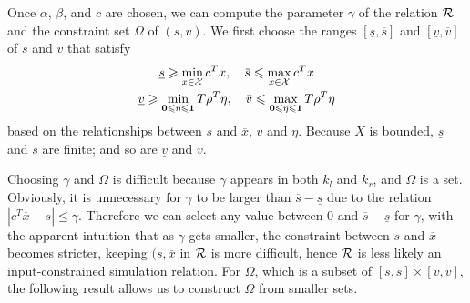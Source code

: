 Once $\alpha$, $\beta$, and $c$ are chosen, we can compute the parameter $\gamma$ of the relation $\mathcal{R}$ and the constraint set $\Omega$ of $(s,v)$.
We first choose the ranges $[\underline{s}, \overbar{s}]$ and $[\underline{v}, \overbar{v}]$ of $s$ and $v$ that satisfy
\begin{gather*}
  \underline{s} \geqslant \min_{x \in \XSet} c^{T} x, \quad
  \overbar{s} \leqslant \max_{x \in \XSet} c^{T} x \\
  \underline{v} \geqslant \min_{\Zero \leqslant \eta \leqslant \One} T \rho^{T} \eta, \quad
  \overbar{v} \leqslant \max_{\Zero \leqslant \eta \leqslant \One} T \rho^{T} \eta
\end{gather*}
based on the relationships between $s$ and $\overbar{x}$, $v$ and $\eta$.
Because $X$ is bounded, $\underline{s}$ and $\overbar{s}$ are finite; and so are $\underline{v}$ and $\overbar{v}$.

Choosing $\gamma$ and $\Omega$ is difficult because $\gamma$ appears in both $k_{l}$ and $k_{r}$, and $\Omega$ is a set.
Obviously, it is unnecessary for $\gamma$ to be larger than $\overbar{s} - \underline{s}$ due to the relation $| c^{T} \overbar{x} - s | \leqslant \gamma$.
Therefore we can select any value between $0$ and $\overbar{s} - \underline{s}$ for $\gamma$, with the apparent intuition that as $\gamma$ gets smaller, the constraint between $s$ and $\overbar{x}$ becomes stricter, keeping $(s, \overbar{x}$ in $\mathcal{R}$ is more difficult, hence $\mathcal{R}$ is less likely an input-constrained simulation relation.
For $\Omega$, which is a subset of $[\underline{s}, \overbar{s}] \times[\underline{v}, \overbar{v}]$, the following result allows us to construct $\Omega$ from smaller sets.


